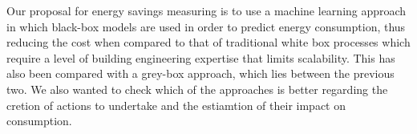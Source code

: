 \documentclass[10pt, conference, compsocconf]{IEEEtran}
\begin{document}
Our proposal for energy savings measuring is to use a machine learning approach in which black-box models are used in order to predict energy consumption, thus reducing the cost when compared to that of traditional white box processes which require a level of building engineering expertise that limits scalability. This has also been compared with a grey-box approach, which lies between the previous two.
We also wanted to check which of the approaches is better regarding the cretion of actions to undertake and the estiamtion of their impact on consumption.








\end{document}
